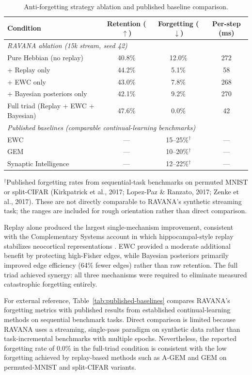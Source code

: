 \documentclass[11pt]{article}
\begin{document}
\begin{table}[h]
\centering
\caption{Anti-forgetting strategy ablation and published baseline comparison.}
\label{tab:ablation}
\begin{tabular}{lccc}
\toprule
Condition & Retention ($\uparrow$) & Forgetting ($\downarrow$) & Per-step (ms) \\
\midrule
\multicolumn{4}{l}{\textit{RAVANA ablation (15k stream, seed 42)}} \\
Pure Hebbian (no replay) & 40.8\% & 12.0\% & 272 \\
\quad + Replay only & 44.2\% & 5.1\% & 58 \\
\quad + EWC only & 43.0\% & 7.8\% & 268 \\
\quad + Bayesian posteriors only & 42.1\% & 9.2\% & 270 \\
Full triad (Replay + EWC + Bayesian) & 47.6\% & 0.0\% & 42 \\
\midrule
\multicolumn{4}{l}{\textit{Published baselines (comparable continual-learning benchmarks)}} \\
\quad EWC \cite{kirkpatrick2017} & --- & 15--25\%$^{\dagger}$ & --- \\
\quad GEM \cite{lopezpaz2017} & --- & 10--20\%$^{\dagger}$ & --- \\
\quad Synaptic Intelligence \cite{zenke2017} & --- & 12--22\%$^{\dagger}$ & --- \\
\bottomrule
\end{tabular}
\par\smallskip
{\footnotesize $^{\dagger}$Published forgetting rates from sequential-task benchmarks on permuted MNIST or split-CIFAR (Kirkpatrick et al., 2017; Lopez-Paz \& Ranzato, 2017; Zenke et al., 2017). These are not directly comparable to RAVANA's synthetic streaming task; the ranges are included for rough orientation rather than direct comparison.}
\end{table}

Replay alone produced the largest single-mechanism improvement, consistent with the Complementary Systems account in which hippocampal-style replay stabilizes neocortical representations \cite{mcclelland1995}. EWC provided a moderate additional benefit by protecting high-Fisher edges, while Bayesian posteriors primarily improved edge efficiency (64\% fewer edges) rather than raw retention. The full triad achieved synergy: all three mechanisms were required to eliminate measured catastrophic forgetting entirely.

For external reference, Table~\ref{tab:published-baselines} compares RAVANA's forgetting metrics with published results from established continual-learning methods on sequential benchmark tasks. Direct comparison is limited because RAVANA uses a streaming, single-pass paradigm on synthetic data rather than task-incremental benchmarks with multiple epochs. Nevertheless, the reported forgetting rate of 0.0\% in the full-triad condition is consistent with the low forgetting achieved by replay-based methods such as A-GEM \cite{chaudhry2019} and GEM \cite{lopezpaz2017} on permuted-MNIST and split-CIFAR variants.
\end{document}
